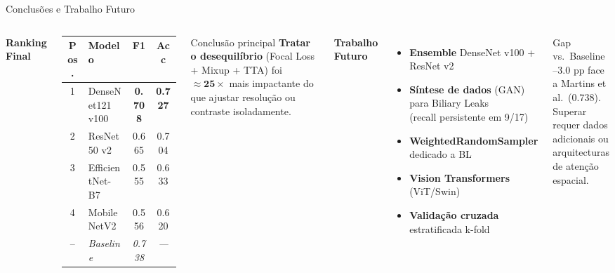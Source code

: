 \documentclass[aspectratio=169]{beamer}
\begin{document}
\begin{frame}{Conclusões e Trabalho Futuro}
  \begin{columns}[T]
      \textbf{Ranking Final}\\[4pt]
      {\small
      \begin{tabular}{clcc}
        \toprule
        Pos. & Modelo & F1 & Acc\\
        \midrule
        \alert{1} & \alert{DenseNet121 v100} & \alert{\textbf{0.708}} & \alert{\textbf{0.727}}\\
        2 & ResNet50 v2        & 0.665 & 0.704\\
        3 & EfficientNet-B7    & 0.555 & 0.633\\
        4 & MobileNetV2        & 0.556 & 0.620\\
        \midrule
        -- & \textit{Baseline} & \textit{0.738} & \textit{---}\\
        \bottomrule
      \end{tabular}
      }
      \vspace{0.5em}

      \begin{alertblock}{Conclusão principal}
        \textbf{Tratar o desequilíbrio} (Focal Loss + Mixup + TTA)
        foi $\mathbf{\approx 25\times}$ mais impactante do que
        ajustar resolução ou contraste isoladamente.
      \end{alertblock}
      \textbf{Trabalho Futuro}
      \begin{itemize}
        \item \textbf{Ensemble} DenseNet v100 + ResNet v2
        \item \textbf{Síntese de dados} (GAN) para Biliary Leaks\\
          (recall persistente em 9/17)
        \item \textbf{WeightedRandomSampler} dedicado a BL
        \item \textbf{Vision Transformers} (ViT/Swin)
        \item \textbf{Validação cruzada} estratificada k-fold
      \end{itemize}
      \medskip
      \begin{block}{Gap vs.\ Baseline}
        --3.0 pp face a Martins et al.\ (0.738).\\
        Superar requer dados adicionais ou\\
        arquitecturas de atenção espacial.
      \end{block}
  \end{columns}
\end{frame}
\end{document}
